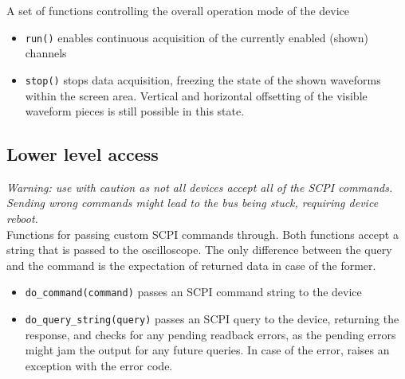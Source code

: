 A set of functions controlling the overall operation mode of the device

\begin{itemize}
    
    \item \verb|run()| enables continuous acquisition of the currently enabled (shown) channels
    \item \verb|stop()| stops data acquisition, freezing the state of the shown waveforms within the screen area. Vertical and horizontal offsetting of the visible waveform pieces is still possible in this state.

\end{itemize}

\subsection*{Lower level access}

\textit{Warning: use with caution as not all devices accept all of the SCPI commands. Sending wrong commands might lead to the bus being stuck, requiring device reboot.}\\

Functions for passing custom SCPI commands through. Both functions accept a string that is passed to the oscilloscope. The only difference between the query and the command is the expectation of returned data in case of the former.

\begin{itemize}
    
    \item \verb|do_command(command)| passes an SCPI command string to the device
    \item \verb|do_query_string(query)| passes an SCPI query to the device, returning the response, and checks for any pending readback errors, as the pending errors might jam the output for any future queries. In case of the error, raises an exception with the error code.

\end{itemize}
